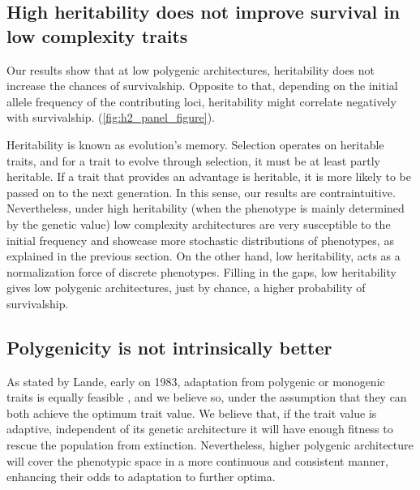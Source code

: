 \documentclass{article}
\begin{document}
\subsection{High heritability does not improve survival in low complexity traits}

Our results show that at low polygenic architectures, heritability does not increase the chances of survivalship. Opposite to that, depending on the initial allele frequency of the contributing loci, heritability might correlate negatively with survivalship. (\ref{fig:h2_panel_figure}).

Heritability is known as evolution's memory.  Selection operates on heritable traits, and for a trait to evolve through selection, it must be at least partly heritable. If a trait that provides an advantage is heritable, it is more likely to be passed on to the next generation.  In this sense, our results are contraintuitive. Nevertheless, under high heritability (when the phenotype is mainly determined by the genetic value) low complexity architectures are very susceptible to the initial frequency and showcase more stochastic distributions of phenotypes, as explained in the previous section. On the other hand, low heritability, acts as a normalization force of discrete phenotypes. Filling in the gaps, low heritability gives low polygenic architectures, just by chance, a higher probability of survivalship.

\subsection{Polygenicity is not intrinsically better}

As stated by Lande, early on 1983, adaptation from polygenic or monogenic traits is equally feasible  \citep{Lande1983-kz}, and we believe so, under the assumption that they can both achieve the optimum trait value. We believe that, if the trait value is adaptive, independent of its genetic architecture it will have enough fitness to rescue the population from extinction. Nevertheless, higher polygenic architecture will cover the phenotypic space in a more continuous and consistent manner, enhancing their odds to adaptation to further optima. 
\end{document}
